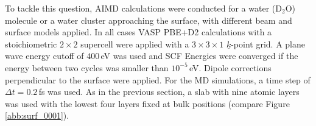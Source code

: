 \documentclass[11pt,DIV=13,BCOR=5mm,a4paper,headinclude]{scrbook}
\renewcommand{\vec}[1]{\underline{#1}}
\begin{document}
To tackle this question, AIMD calculations were conducted for a water (D$_2$O) molecule or a water cluster approaching the surface, with different beam and surface models applied.
In all cases VASP PBE+D2 calculations with a stoichiometric $2\times 2$ supercell were applied with a $3\times 3 \times 1$ $\vec{k}$-point grid.
A plane wave energy cutoff of $400\,$eV was used and SCF Energies were converged if the energy between two cycles was smaller than $10^{-5}\,$eV.
Dipole corrections perpendicular to the surface were applied.
For the MD simulations, a time step of $\Delta t=0.2\,$fs was used.
As in the previous section, a slab with nine atomic layers was used with the lowest four layers fixed at bulk positions (compare Figure \ref{abb:surf_0001}).

\end{document}
